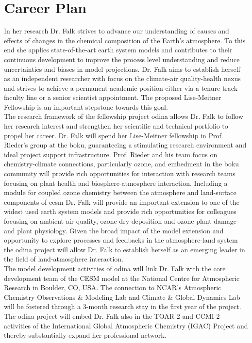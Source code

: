 \section{Career Plan}
\label{sec:career}
In her research Dr. Falk strives to advance our understanding of causes and effects of changes in the chemical composition of the Earth’s atmosphere. To this end she applies state-of-the-art earth system models and contributes to their continuous development to improve the process level understanding and reduce uncertainties and biases in model projections. Dr. Falk aims to establish herself as an independent researcher with focus on the climate-air quality-health nexus and strives to achieve a permanent academic position either via a tenure-track faculty line or a senior scientist appointment. The proposed Lise-Meitner Fellowship is an important stepstone towards this goal.\\
The research framework of the fellowship project \gls{odina} allows Dr. Falk to follow her research interest and strengthen her scientific and technical portfolio to propel her career. Dr. Falk will spend her Lise-Meitner fellowship in Prof. Rieder’s group at the \gls{boku}, guaranteeing a stimulating research environment and ideal project support infrastructure. Prof. Rieder and his team focus on chemistry-climate connections, particularly ozone, and embedment in the \gls{boku} community will provide rich opportunities for interaction with research teams focusing on plant health and biosphere-atmosphere interaction. Including a module for coupled ozone chemistry between the atmosphere and land-surface components of \gls{cesm} Dr. Falk will provide an important extension to one of the widest used earth system models and provide rich opportunities for colleagues focusing on ambient air quality, ozone dry deposition and ozone plant damage and plant physiology. Given the broad impact of the model extension and opportunity to explore processes and feedbacks in the atmosphere-land system the \gls{odina} project will allow Dr. Falk to establish herself as an emerging leader in the field of land-atmosphere interaction.\\
The model development activities of \gls{odina} will link Dr. Falk with the core development team of the CESM model at the National Centre for Atmospheric Research in Boulder, CO, USA. The connection to NCAR’s Atmospheric Chemistry Observations \& Modeling Lab and Climate \& Global Dynamics Lab will be fostered through a 3-month research stay in the first year of the project. The \gls{odina} project will embed Dr. Falk also in the TOAR-2 and CCMI-2 activities of the International Global Atmospheric Chemistry (IGAC) Project and thereby substantially expand her professional network.\\
